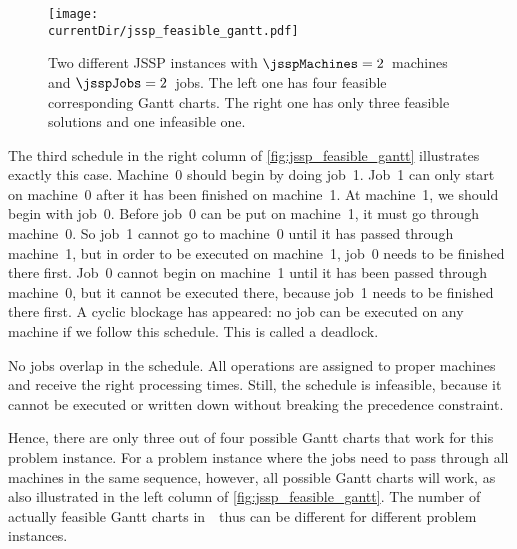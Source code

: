 \begin{figure}%
\centering%
\texttt{[image: \\currentDir/jssp\_feasible\_gantt.pdf]}%
\caption{Two different JSSP instances with $\jsspMachines=2$~machines and $\jsspJobs=2$~jobs.%
The left one has four feasible corresponding Gantt charts.
The right one has only three feasible solutions and one infeasible one.}%
\label{fig:jssp_feasible_gantt}%
\end{figure}%

The third schedule in the right column of \autoref{fig:jssp_feasible_gantt} illustrates exactly this case.
Machine~0 should begin by doing job~1.
Job~1 can only start on machine~0 after it has been finished on machine~1.
At machine~1, we should begin with job~0.
Before job~0 can be put on machine~1, it must go through machine~0.
So job~1 cannot go to machine~0 until it has passed through machine~1, but in order to be executed on machine~1, job~0 needs to be finished there first.
Job~0 cannot begin on machine~1 until it has been passed through machine~0, but it cannot be executed there, because job~1 needs to be finished there first.
A cyclic blockage has appeared: no job can be executed on any machine if we follow this schedule.
This is called a deadlock.

No jobs overlap in the schedule.
All operations are assigned to proper machines and receive the right processing times.
Still, the schedule is infeasible, because it cannot be executed or written down without breaking the precedence constraint.

Hence, there are only three out of four possible Gantt charts that work for this problem instance.
For a problem instance where the jobs need to pass through all machines in the same sequence, however, all possible Gantt charts will work, as also illustrated in the left column of \autoref{fig:jssp_feasible_gantt}.
The number of actually feasible Gantt charts in~\solutionSpace\ thus can be different for different problem instances.

